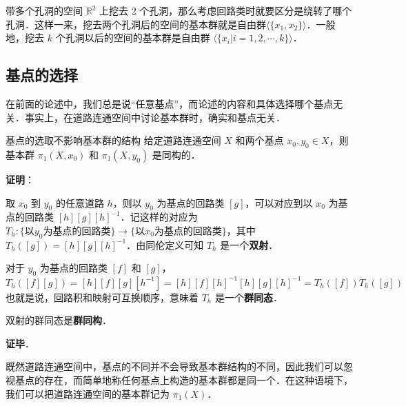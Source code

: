 \begin{example}{带多个孔洞的空间}
$\mathbb{R}^2$ 上挖去 $2$ 个孔洞，那么考虑回路类时就要区分是绕转了哪个孔洞．这样一来，挖去两个孔洞后的空间的基本群就是自由群$\langle\{x_1, x_2\}\rangle$．一般地，挖去 $k$ 个孔洞以后的空间的基本群是自由群 $\langle\{x_i|i=1, 2, \cdots, k\}\rangle$．
\end{example}

\subsection{基点的选择}

在前面的论述中，我们总是说“任意基点”，而论述的内容和具体选择哪个基点无关．事实上，在道路连通空间中讨论基本群时，确实和基点无关．

\begin{theorem}{基点的选取不影响基本群的结构}
给定道路连通空间 $X$ 和两个基点 $x_0, y_0\in X$，则基本群 $\pi_1(X, x_0)$ 和 $\pi_1(X, y_0)$ 是同构的．
\end{theorem}

\textbf{证明}：

取 $x_0$ 到 $y_0$ 的任意道路 $h$，则以 $y_0$ 为基点的回路类 $[g]$，可以对应到以 $x_0$ 为基点的回路类 $[h][g][h]^{-1}$．记这样的对应为 $T_h: \{\text{以} y_0 \text{为基点的回路类}\}\rightarrow\{\text{以} x_0 \text{为基点的回路类}\}$，其中 $T_h([g])=[h][g][h]^{-1}$．由同伦定义可知 $T_h$ 是一个\textbf{双射}．

对于 $y_0$ 为基点的回路类 $[f]$ 和 $[g]$，$$T_h([f][g])=[h][f][g][h^{-1}]=[h][f][h]^{-1}[h][g][h]^{-1}=T_h([f])T_h([g])$$
也就是说，回路积和映射可互换顺序，意味着 $T_h$ 是一个\textbf{群同态}．

双射的群同态是\textbf{群同构}．

\textbf{证毕}．

既然道路连通空间中，基点的不同并不会导致基本群结构的不同，因此我们可以忽视基点的存在，而简单地称任何基点上构造的基本群都是同一个．在这种语境下，我们可以把道路连通空间的基本群记为 $\pi_1(X)$．



